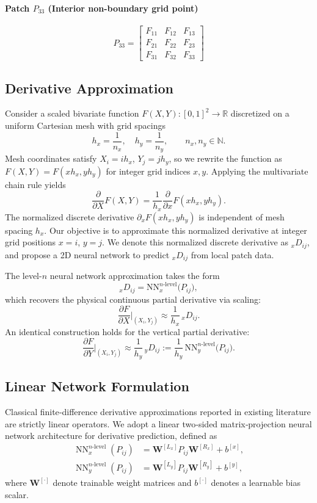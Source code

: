 \documentclass[pdflatex,sn-mathphys-num]{sn-jnl}%
\theoremstyle{thmstyleone}%
\theoremstyle{thmstyletwo}%
\theoremstyle{thmstylethree}%
\begin{document}
\paragraph{Patch $P_{33}$ (Interior non-boundary grid point)}
\[
P_{33}=
\begin{bmatrix}
F_{11} & F_{12} & F_{13}\\
F_{21} & F_{22} & F_{23}\\
F_{31} & F_{32} & F_{33}
\end{bmatrix}
\]

\subsection{Derivative Approximation}
Consider a scaled bivariate function $F(X,Y): [0,1]^2\to \mathbb{R}$ discretized on a uniform Cartesian mesh with grid spacings
\[
h_x=\frac{1}{n_x},\quad h_y=\frac{1}{n_y},\qquad n_x,n_y\in\mathbb{N}.
\]
Mesh coordinates satisfy $X_i = i h_x$, $Y_j = j h_y$, so we rewrite the function as $F(X,Y) = F(x h_x, y h_y)$ for integer grid indices $x,y$. Applying the multivariate chain rule yields
\[
\frac{\partial}{\partial X} F(X,Y) = \frac{1}{h_x} \frac{\partial}{\partial x} F(x h_x, y h_y).
\]
The normalized discrete derivative $\partial_x F(x h_x,y h_y)$ is independent of mesh spacing $h_x$. Our objective is to approximate this normalized derivative at integer grid positions $x=i$, $y=j$. We denote this normalized discrete derivative as ${}_x D_{ij}$, and propose a 2D neural network to predict ${}_x D_{ij}$ from local patch data.

The level-$n$ neural network approximation takes the form
\[
{}_x D_{ij} = \mathrm{NN}^{n\text{-level}}_x\big(P_{ij}\big),
\]
which recovers the physical continuous partial derivative via scaling:
\[
\frac{\partial F}{\partial X}\bigg|_{(X_i,Y_j)} \approx \frac{1}{h_x}\, {}_x D_{ij}.
\]
An identical construction holds for the vertical partial derivative:
\[
\frac{\partial F}{\partial Y}\bigg|_{(X_i,Y_j)} \approx \frac{1}{h_y}\, {}_y D_{ij} := \frac{1}{h_y}\,\mathrm{NN}^{n\text{-level}}_y\big(P_{ij}\big).
\]


 
  \subsection{Linear Network Formulation}
Classical finite‑difference derivative approximations reported in existing literature are strictly linear operators. We adopt a linear two‑sided matrix‑projection neural network architecture for derivative prediction, defined as
\begin{align*}
\operatorname{NN}^{n\text{-level}}_x(P_{ij}) &= \boldsymbol{W}^{[L_x]} P_{ij} \boldsymbol{W}^{[R_x]} + b^{[x]},\\
\operatorname{NN}^{n\text{-level}}_y(P_{ij}) &= \boldsymbol{W}^{[L_y]} P_{ij} \boldsymbol{W}^{[R_y]} + b^{[y]},
\end{align*}
where $\boldsymbol{W}^{[\cdot]}$ denote trainable weight matrices and $b^{[\cdot]}$ denotes a learnable bias scalar.
\end{document}
